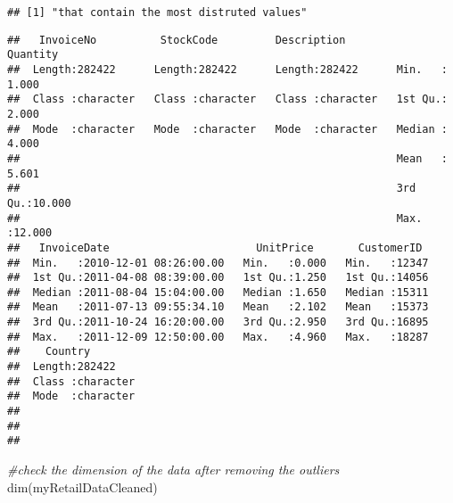 \documentclass[
]{article}
\newenvironment{Shaded}{\begin{snugshade}}{\end{snugshade}}
\newcommand{\CommentTok}[1]{\textcolor[rgb]{0.56,0.35,0.01}{\textit{#1}}}
\newcommand{\DecValTok}[1]{\textcolor[rgb]{0.00,0.00,0.81}{#1}}
\newcommand{\FunctionTok}[1]{\textcolor[rgb]{0.00,0.00,0.00}{#1}}
\newcommand{\NormalTok}[1]{#1}
\newcommand{\OtherTok}[1]{\textcolor[rgb]{0.56,0.35,0.01}{#1}}
\newcommand{\SpecialCharTok}[1]{\textcolor[rgb]{0.00,0.00,0.00}{#1}}
\begin{document}
\begin{verbatim}
## [1] "that contain the most distruted values"
\end{verbatim}

\begin{Shaded}
\end{Shaded}

\begin{verbatim}
##   InvoiceNo          StockCode         Description           Quantity     
##  Length:282422      Length:282422      Length:282422      Min.   : 1.000  
##  Class :character   Class :character   Class :character   1st Qu.: 2.000  
##  Mode  :character   Mode  :character   Mode  :character   Median : 4.000  
##                                                           Mean   : 5.601  
##                                                           3rd Qu.:10.000  
##                                                           Max.   :12.000  
##   InvoiceDate                       UnitPrice       CustomerID   
##  Min.   :2010-12-01 08:26:00.00   Min.   :0.000   Min.   :12347  
##  1st Qu.:2011-04-08 08:39:00.00   1st Qu.:1.250   1st Qu.:14056  
##  Median :2011-08-04 15:04:00.00   Median :1.650   Median :15311  
##  Mean   :2011-07-13 09:55:34.10   Mean   :2.102   Mean   :15373  
##  3rd Qu.:2011-10-24 16:20:00.00   3rd Qu.:2.950   3rd Qu.:16895  
##  Max.   :2011-12-09 12:50:00.00   Max.   :4.960   Max.   :18287  
##    Country         
##  Length:282422     
##  Class :character  
##  Mode  :character  
##                    
##                    
## 
\end{verbatim}

\begin{Shaded}
\begin{Highlighting}[]
\CommentTok{\#check the dimension of the data after removing the outliers}
\FunctionTok{dim}\NormalTok{(myRetailDataCleaned)}
\end{Highlighting}
\end{Shaded}
\end{document}
